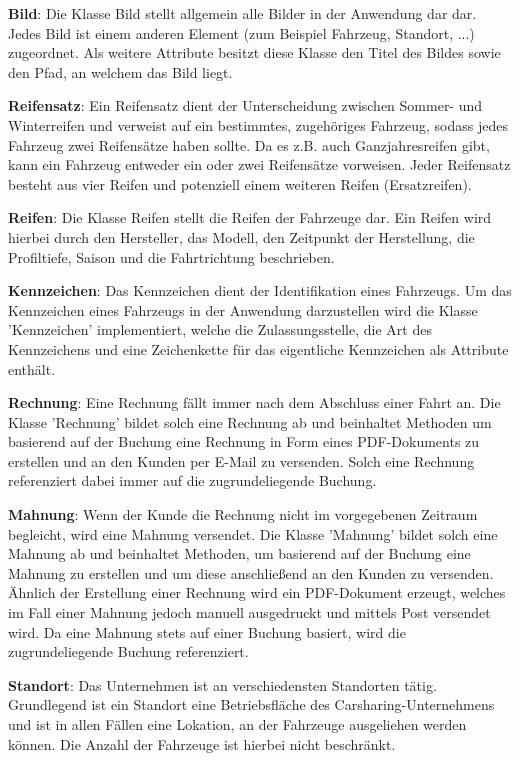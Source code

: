 \textbf{Bild}: Die Klasse Bild stellt allgemein alle Bilder in der Anwendung dar dar. Jedes Bild ist einem anderen Element (zum Beispiel Fahrzeug, Standort, ...) zugeordnet. Als weitere Attribute besitzt diese Klasse den Titel des Bildes sowie den Pfad, an welchem das Bild liegt.

\textbf{Reifensatz}: Ein Reifensatz dient der Unterscheidung zwischen Sommer- und Winterreifen und verweist auf ein bestimmtes, zugehöriges Fahrzeug, sodass jedes Fahrzeug zwei Reifensätze haben sollte. Da es z.B. auch Ganzjahresreifen gibt, kann ein Fahrzeug entweder ein oder zwei Reifensätze vorweisen.  
Jeder Reifensatz besteht aus vier Reifen und potenziell einem weiteren Reifen (Ersatzreifen).

\textbf{Reifen}: Die Klasse Reifen stellt die Reifen der Fahrzeuge dar. Ein Reifen wird hierbei durch den Hersteller, das Modell, den Zeitpunkt der Herstellung, die Profiltiefe, Saison und die Fahrtrichtung beschrieben.

\textbf{Kennzeichen}: Das Kennzeichen dient der Identifikation eines Fahrzeugs. Um das Kennzeichen eines Fahrzeugs in der Anwendung darzustellen wird die Klasse 'Kennzeichen' implementiert, welche die Zulassungsstelle, die Art des Kennzeichens und eine Zeichenkette für das eigentliche Kennzeichen als Attribute enthält.

\textbf{Rechnung}: Eine Rechnung fällt immer nach dem Abschluss einer Fahrt an. Die Klasse 'Rechnung' bildet solch eine Rechnung ab und beinhaltet Methoden um basierend auf der Buchung eine Rechnung in Form eines PDF-Dokuments zu erstellen und an den Kunden per E-Mail zu versenden. Solch eine Rechnung referenziert dabei immer auf die zugrundeliegende Buchung.

\textbf{Mahnung}: Wenn der Kunde die Rechnung nicht im vorgegebenen Zeitraum begleicht, wird eine Mahnung versendet. Die Klasse 'Mahnung' bildet solch eine Mahnung ab und beinhaltet Methoden, um basierend auf der Buchung eine Mahnung zu erstellen und um diese anschließend an den Kunden zu versenden. Ähnlich der Erstellung einer Rechnung wird ein PDF-Dokument erzeugt, welches im Fall einer Mahnung jedoch manuell ausgedruckt und mittels Post versendet wird. Da eine Mahnung stets auf einer Buchung basiert, wird die zugrundeliegende Buchung referenziert.

\textbf{Standort}: Das Unternehmen ist an verschiedensten Standorten tätig. Grundlegend ist ein Standort eine Betriebsfläche des Carsharing-Unternehmens und ist in allen Fällen eine Lokation, an der Fahrzeuge ausgeliehen werden können. Die Anzahl der Fahrzeuge ist hierbei nicht beschränkt.


